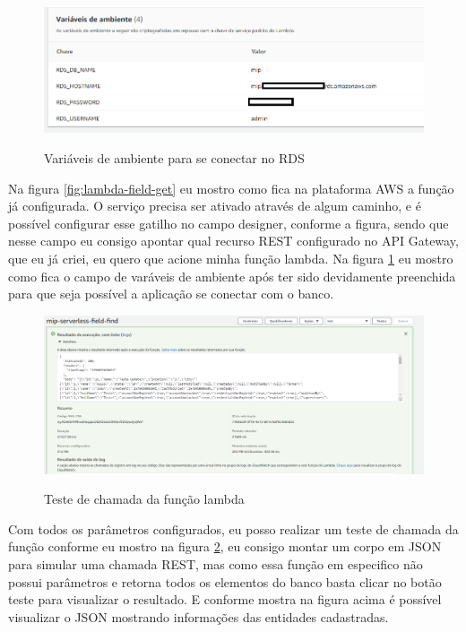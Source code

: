 \begin{figure}[!htb]
	\centering
	\caption{Variáveis de ambiente para se conectar no RDS}
	\includegraphics[width=1\textwidth,height=0.2\textheight]{./dados/figuras/credenciais-lambda}
	\label{fig:credenciais-lambda}
\end{figure}

Na figura \ref{fig:lambda-field-get} eu mostro como fica na plataforma AWS a função já configurada. O serviço precisa ser ativado através de algum caminho, e é possível configurar esse gatilho no campo designer, conforme a figura, sendo que nesse campo eu consigo apontar qual recurso REST configurado no API Gateway, que eu já criei, eu quero que acione minha função lambda. Na figura \ref{fig:credenciais-lambda} eu mostro como fica o campo de varáveis de ambiente após ter sido devidamente preenchida para que seja possível a aplicação se conectar com o banco.

\begin{figure}[!htb]
	\centering
	\caption{Teste de chamada da função lambda}
	\includegraphics[width=1\textwidth,height=0.3\textheight]{./dados/figuras/lambda-test}
	\label{fig:lambda-test}
\end{figure}

Com todos os parâmetros configurados, eu posso realizar um teste de chamada da função conforme eu mostro na figura \ref{fig:lambda-test}, eu consigo montar um corpo em JSON para simular uma chamada REST, mas como essa função em especifico não possui parâmetros e retorna todos os elementos do banco basta clicar no botão teste para visualizar o resultado. E conforme mostra na figura acima é possível visualizar o JSON mostrando informações das entidades cadastradas.

